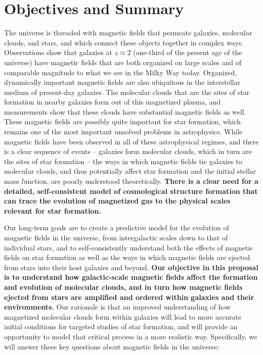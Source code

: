 \vspace{-6mm}
\section{Objectives and Summary}
\label{sec:objectives}
\vspace{-3mm}

The universe is threaded with magnetic fields that permeate
galaxies, molecular clouds, and stars, and which connect these objects
together in complex ways.  Observations show that galaxies at $z
\simeq 2$ (one-third of the present age of the universe) have magnetic
fields that are both organized on large scales and of comparable
magnitude to what we see in the Milky Way today.  Organized, dynamically important magnetic fields are also
ubiquitous in the interstellar medium of present-day galaxies.  The
molecular clouds that are the sites of star formation in nearby
galaxies form out of this magnetized plasma, and measurements show
that these clouds have substantial magnetic fields as well.  These
magnetic fields are possibly quite important for star formation, which
remains one of the most important unsolved problems in astrophysics.
While magnetic fields have been observed in all of these astrophysical
regimes, and there is a clear sequence of events -- galaxies form
molecular clouds, which in turn are the sites of star formation -- the
ways in which magnetic fields tie galaxies to molecular clouds, and
thus potentially affect star formation and the initial stellar mass
function, are poorly understood theoretically.  
\textbf{There is a
clear need for a detailed, self-consistent model of cosmological
structure formation that can trace the evolution of magnetized gas to
the physical scales relevant for star formation.}

Our long-term goals are to create a predictive model for the evolution
of magnetic fields in the universe, from intergalactic scales down to
that of individual stars, and to self-consistently understand both the
effects of magnetic fields on star formation as well as the ways in
which magnetic fields are ejected from stars into their host galaxies
and beyond.
\textbf{Our objective in this proposal is to understand how galactic-scale
magnetic fields affect the formation and evolution of molecular
clouds, and in turn how magnetic fields ejected from stars are
amplified and ordered within galaxies and their environments.}  Our rationale is that an improved
understanding of how magnetized molecular clouds form within galaxies
will lead to more accurate initial conditions for targeted studies of
star formation, and will provide an opportunity to model that critical
process in a more realistic way.  
Specifically, we will answer these key questions about magnetic fields
in the universe:

